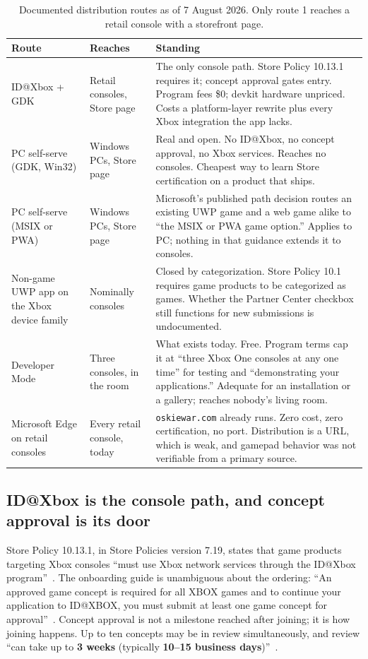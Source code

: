 \documentclass[10pt,letterpaper,twocolumn]{article}
\newcommand{\code}[1]{\texttt{#1}}
\begin{document}
\begin{table}[!t]
\centering
\caption{Documented distribution routes as of 7 August 2026. Only route 1 reaches a retail console with a storefront page.}
\label{tab:routes}
\footnotesize
\begin{tabularx}{\textwidth}{@{}P{0.20\textwidth}P{0.16\textwidth}L@{}}
\toprule
Route & Reaches & Standing \\
\midrule
ID@Xbox + GDK & Retail consoles, Store page & The only console path. Store Policy 10.13.1 requires it; concept approval gates entry. Program fees \$0; devkit hardware unpriced. Costs a platform-layer rewrite plus every Xbox integration the app lacks. \\
PC self-serve (GDK, Win32) & Windows PCs, Store page & Real and open. No ID@Xbox, no concept approval, no Xbox services. Reaches no consoles. Cheapest way to learn Store certification on a product that ships. \\
PC self-serve (MSIX or PWA) & Windows PCs, Store page & Microsoft's published path decision routes an existing UWP game and a web game alike to ``the MSIX or PWA game option.'' Applies to PC; nothing in that guidance extends it to consoles. \\
Non-game UWP app on the Xbox device family & Nominally consoles & Closed by categorization. Store Policy 10.1 requires game products to be categorized as games. Whether the Partner Center checkbox still functions for new submissions is undocumented. \\
Developer Mode & Three consoles, in the room & What exists today. Free. Program terms cap it at ``three Xbox One consoles at any one time'' for testing and ``demonstrating your applications.'' Adequate for an installation or a gallery; reaches nobody's living room. \\
Microsoft Edge on retail consoles & Every retail console, today & \code{oskiewar.com} already runs. Zero cost, zero certification, no port. Distribution is a URL, which is weak, and gamepad behavior was not verifiable from a primary source. \\
\bottomrule
\end{tabularx}
\end{table}

\subsection{ID@Xbox is the console path, and concept approval is its door}

Store Policy 10.13.1, in Store Policies version 7.19, states that game products targeting Xbox consoles ``must use Xbox network services through the ID@Xbox program''~\cite{msStorePolicies}. The onboarding guide is unambiguous about the ordering: ``An approved game concept is required for all XBOX games and to continue your application to ID@XBOX, you must submit at least one game concept for approval''~\cite{msJoinId}. Concept approval is not a milestone reached after joining; it is how joining happens. Up to ten concepts may be in review simultaneously, and review ``can take up to \textbf{3 weeks} (typically \textbf{10--15 business days})''~\cite{msJoinId}.
\end{document}

